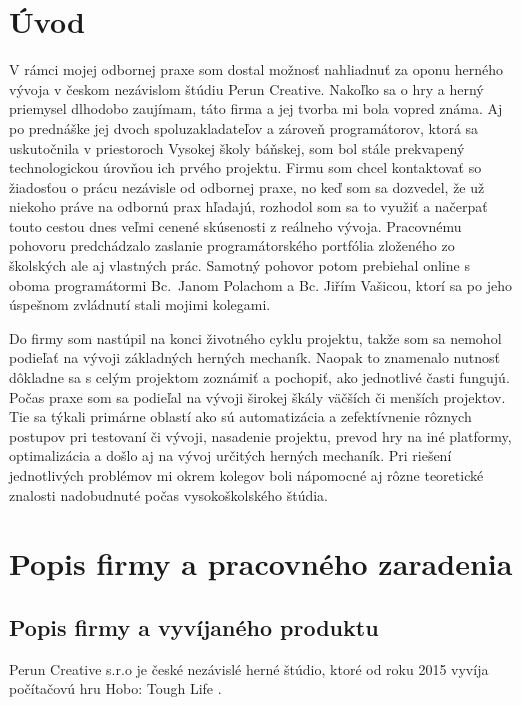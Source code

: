 \documentclass[slovak, bachelorpractice]{diploma}
\begin{document}
\MakeTitlePages

\chapter{Úvod}
\label{sec:Introduction}
V rámci mojej odbornej praxe som dostal možnosť nahliadnuť za oponu herného vývoja v českom nezávislom štúdiu Perun Creative. Nakoľko sa o hry a herný priemysel dlhodobo zaujímam, táto firma a jej tvorba mi bola vopred známa. Aj po prednáške jej dvoch spoluzakladateľov a zároveň programátorov, ktorá sa uskutočnila v priestoroch Vysokej školy báňskej, som bol stále prekvapený technologickou úrovňou ich prvého projektu. Firmu som chcel kontaktovať so žiadosťou o prácu nezávisle od odbornej praxe, no keď som sa dozvedel, že už niekoho práve na odbornú prax hľadajú, rozhodol som sa to využiť a načerpať touto cestou dnes veľmi cenené skúsenosti z reálneho vývoja. Pracovnému pohovoru predchádzalo zaslanie programátorského portfólia zloženého zo školských ale aj vlastných prác. Samotný pohovor potom prebiehal online s oboma programátormi \mbox{Bc. Janom} Polachom a Bc. Jiřím Vašicou, ktorí sa po jeho úspešnom zvládnutí stali mojimi kolegami.

Do firmy som nastúpil na konci životného cyklu projektu, takže som sa nemohol podieľať na vývoji základných herných mechaník. Naopak to znamenalo nutnosť dôkladne sa s celým projektom zoznámiť a pochopiť, ako jednotlivé časti fungujú. Počas praxe som sa podieľal na vývoji širokej škály väčších či menších projektov. Tie sa týkali primárne oblastí ako sú automatizácia a zefektívnenie rôznych postupov pri testovaní či vývoji, nasadenie projektu, prevod hry na iné platformy, optimalizácia a došlo aj na vývoj určitých herných mechaník. Pri riešení jednotlivých problémov mi okrem kolegov boli nápomocné aj rôzne teoretické znalosti nadobudnuté počas vysokoškolského štúdia.

\chapter{Popis firmy a pracovného zaradenia}
\label{sec:Firm and me}
\section{Popis firmy a vyvíjaného produktu}
\label{sec:Firm}
Perun Creative s.r.o je české nezávislé herné štúdio, ktoré od roku 2015 vyvíja počítačovú hru Hobo: Tough Life \cite{Perun}.
\end{document}
